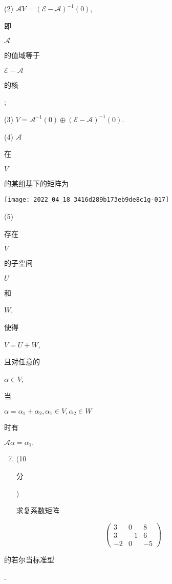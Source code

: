 \documentclass[10pt]{article}
\begin{document}
(2) $\mathscr{A} V=(\mathscr{E}-\mathscr{A})^{-1}(0)$, \begin{CJK}{UTF8}{mj}即\end{CJK} $\mathscr{A}$ \begin{CJK}{UTF8}{mj}的值域等于\end{CJK} $\mathscr{E}-\mathscr{A}$ \begin{CJK}{UTF8}{mj}的核\end{CJK};

(3) $V=\mathscr{A}^{-1}(0) \oplus(\mathscr{E}-\mathscr{A})^{-1}(0)$.

(4) $\mathscr{A}$ \begin{CJK}{UTF8}{mj}在\end{CJK} $V$ \begin{CJK}{UTF8}{mj}的某组基下的矩阵为\end{CJK}

\texttt{[image: 2022\_04\_18\_3416d289b173eb9de8c1g-017]}

(5) \begin{CJK}{UTF8}{mj}存在\end{CJK} $V$ \begin{CJK}{UTF8}{mj}的子空间\end{CJK} $U$ \begin{CJK}{UTF8}{mj}和\end{CJK} $W$, \begin{CJK}{UTF8}{mj}使得\end{CJK} $V=U+W$, \begin{CJK}{UTF8}{mj}且对任意的\end{CJK} $\alpha \in V$, \begin{CJK}{UTF8}{mj}当\end{CJK} $\alpha=\alpha_{1}+\alpha_{2}, \alpha_{1} \in V, \alpha_{2} \in W$ \begin{CJK}{UTF8}{mj}时有\end{CJK} $\mathscr{A} \alpha=\alpha_{1} .$

\begin{enumerate}
  \setcounter{enumi}{6}
  \item (10 \begin{CJK}{UTF8}{mj}分\end{CJK}) \begin{CJK}{UTF8}{mj}求复系数矩阵\end{CJK}
\end{enumerate}
$$
\left(\begin{array}{ccc}
3 & 0 & 8 \\
3 & -1 & 6 \\
-2 & 0 & -5
\end{array}\right)
$$
\begin{CJK}{UTF8}{mj}的若尔当标准型\end{CJK}.
\end{document}
